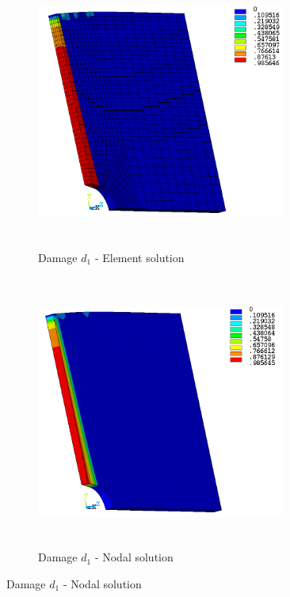 \documentclass[12pt,a4paper,twoside,openright]{report}
\begin{document}
\begin{figure}[htbp!]
     \captionsetup[subfigure]{justification=centering}
     \begin{subfigure}[htbp!]{0.4\textwidth}
     \begin{center}
         \includegraphics[width=8.2cm,height=9cm]{27.d1-lt-e.png}
         \caption{Damage $d_{1}$ - Element solution}
         \label{fig:d1-lt-e}
     \end{center}
     \end{subfigure}
     \hspace{1.9cm}
     \begin{subfigure}[htbp!]{0.4\textwidth}
         \includegraphics[width=8.2cm,height=9cm]{27.d1-lt-n.png}
         \caption{Damage $d_{1}$ - Nodal solution}
         \label{fig:d1-lt-n}
     \end{subfigure}
\end{figure}
\end{document}
